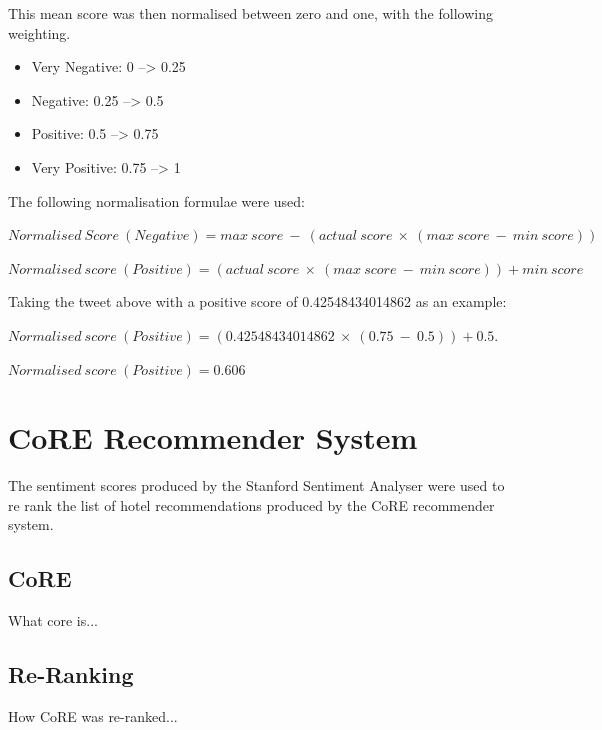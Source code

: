 This mean score was then normalised between zero and one, with the following weighting.
\begin{itemize}
    \item Very Negative: 0 --> 0.25
    \item Negative: 0.25 --> 0.5
    \item Positive: 0.5 --> 0.75
    \item Very Positive: 0.75 --> 1
\end{itemize}

The following normalisation formulae were used:

\begin{tcolorbox}
\begin{center}
	$Normalised\ Score\ (Negative) = max\ score\ -\ (actual\ score\ \times\ (max\ score\ -\ min\ score))$

    $Normalised\ score\ (Positive) = (actual\ score\ \times\ (max\ score\ -\ min\ score)) + min\ score$
\end{center}
\end{tcolorbox}

Taking the tweet above with a positive score of 0.42548434014862 as an example:
\begin{tcolorbox}
$Normalised\ score\ (Positive) = (0.42548434014862\ \times\ (0.75\ -\ 0.5)) + 0.5.$

$Normalised\ score\ (Positive) = 0.606$
\end{tcolorbox}

\section{CoRE Recommender System}

The sentiment scores produced by the Stanford Sentiment Analyser were used to re rank the list of hotel recommendations produced by the CoRE recommender system.

\subsection*{CoRE}
What core is...
\subsection*{Re-Ranking}
How CoRE was re-ranked...



